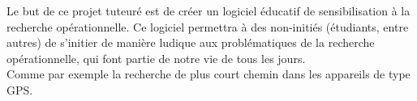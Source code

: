 \setcounter{footnote}{0}
Le but de ce projet tuteuré est de créer un logiciel éducatif de sensibilisation à
la recherche opérationnelle. Ce logiciel permettra à des non-initiés
(étudiants, entre autres) de s'initier de manière ludique aux
problématiques de la recherche opérationnelle, qui font partie
de notre vie de tous les jours.\\
Comme par exemple la recherche de plus court chemin dans les appareils
de type GPS.
